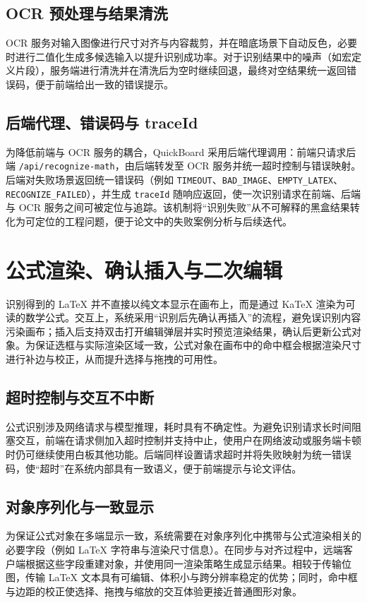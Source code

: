 \subsection{OCR 预处理与结果清洗}
OCR 服务对输入图像进行尺寸对齐与内容裁剪，并在暗底场景下自动反色，必要时进行二值化生成多候选输入以提升识别成功率。对于识别结果中的噪声（如宏定义片段），服务端进行清洗并在清洗后为空时继续回退，最终对空结果统一返回错误码，便于前端给出一致的错误提示。

\subsection{后端代理、错误码与 traceId}
为降低前端与 OCR 服务的耦合，QuickBoard 采用后端代理调用：前端只请求后端 \texttt{/api/recognize-math}，由后端转发至 OCR 服务并统一超时控制与错误映射。后端对失败场景返回统一错误码（例如 \texttt{TIMEOUT}、\texttt{BAD\_IMAGE}、\texttt{EMPTY\_LATEX}、\texttt{RECOGNIZE\_FAILED}），并生成 \texttt{traceId} 随响应返回，使一次识别请求在前端、后端与 OCR 服务之间可被定位与追踪。该机制将“识别失败”从不可解释的黑盒结果转化为可定位的工程问题，便于论文中的失败案例分析与后续迭代。

\section{公式渲染、确认插入与二次编辑}
识别得到的 LaTeX 并不直接以纯文本显示在画布上，而是通过 KaTeX 渲染为可读的数学公式。交互上，系统采用“识别后先确认再插入”的流程，避免误识别内容污染画布；插入后支持双击打开编辑弹层并实时预览渲染结果，确认后更新公式对象。为保证选框与实际渲染区域一致，公式对象在画布中的命中框会根据渲染尺寸进行补边与校正，从而提升选择与拖拽的可用性。

\subsection{超时控制与交互不中断}
公式识别涉及网络请求与模型推理，耗时具有不确定性。为避免识别请求长时间阻塞交互，前端在请求侧加入超时控制并支持中止，使用户在网络波动或服务端卡顿时仍可继续使用白板其他功能。后端同样设置请求超时并将失败映射为统一错误码，使“超时”在系统内部具有一致语义，便于前端提示与论文评估。

\subsection{对象序列化与一致显示}
为保证公式对象在多端显示一致，系统需要在对象序列化中携带与公式渲染相关的必要字段（例如 LaTeX 字符串与渲染尺寸信息）。在同步与对齐过程中，远端客户端根据这些字段重建对象，并使用同一渲染策略生成显示结果。相较于传输位图，传输 LaTeX 文本具有可编辑、体积小与跨分辨率稳定的优势；同时，命中框与边距的校正使选择、拖拽与缩放的交互体验更接近普通图形对象。
